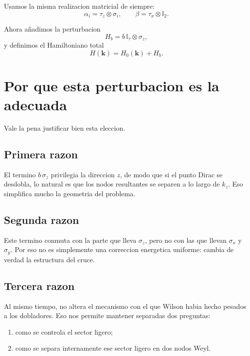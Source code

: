 Usamos la misma realizacion matricial de siempre:
\begin{equation}
\alpha_i=\tau_z\otimes \sigma_i,
\qquad
\beta=\tau_x\otimes \mathbb{I}_2.
\end{equation}

Ahora añadimos la perturbacion
\begin{equation}
H_b = b\,\mathbb{I}_\tau\otimes \sigma_z,
\label{c12:eq:Hb}
\end{equation}
y definimos el Hamiltoniano total
\begin{equation}
H(\bm{k}) = H_0(\bm{k}) + H_b.
\label{c12:eq:Htot}
\end{equation}

\section{Por que esta perturbacion es la adecuada}
Vale la pena justificar bien esta eleccion.

\subsection{Primera razon}
El termino \(b\,\sigma_z\) privilegia la direccion \(z\), de modo que si el punto Dirac se desdobla, lo natural es que los nodos resultantes se separen a lo largo de \(k_z\). Eso simplifica mucho la geometria del problema.

\subsection{Segunda razon}
Este termino conmuta con la parte que lleva \(\sigma_z\), pero no con las que llevan \(\sigma_x\) y \(\sigma_y\). Por eso no es simplemente una correccion energetica uniforme: cambia de verdad la estructura del cruce.

\subsection{Tercera razon}
Al mismo tiempo, no altera el mecanismo con el que Wilson habia hecho pesados a los dobladores. Eso nos permite mantener separadas dos preguntas:
\begin{enumerate}[label=\arabic*.]
    \item como se controla el sector ligero;
    \item como se separa internamente ese sector ligero en dos nodos Weyl.
\end{enumerate}

